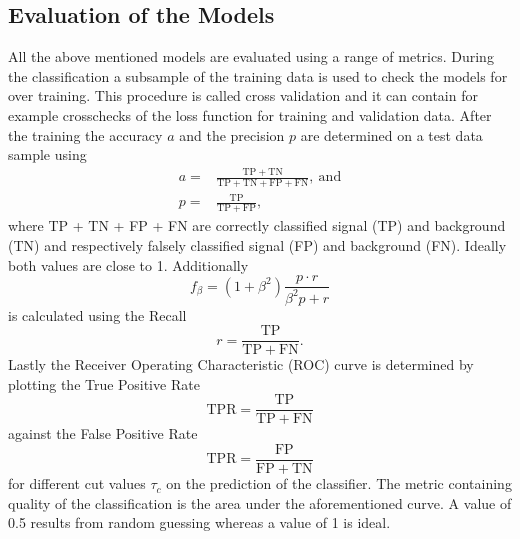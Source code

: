 \subsection{Evaluation of the Models}
All the above mentioned models are evaluated using a range of metrics. During the classification a subsample of the training data is used to check the models for over training. This procedure is called cross validation and it can contain for example crosschecks of the loss function for training and validation data. After the training the accuracy $a$ and the precision $p$ are determined on a test data sample using 
\begin{align*}
	a =& \frac{\mathrm{TP + TN}}{\mathrm{TP + TN + FP + FN}},\ \mathrm{and}\\
	p=&  \frac{\mathrm{TP}}{\mathrm{TP + FP}},
\end{align*}
where TP + TN + FP + FN are correctly classified signal (TP) and background (TN) and respectively falsely classified signal (FP) and background (FN). Ideally both values are close to 1. 
Additionally 
\begin{equation}
	f_\beta = (1+\beta^2) \frac{p\cdot r}{\beta^2p+r}
\end{equation}
is calculated using the Recall
\begin{equation*}
r = \frac{\mathrm{TP}}{\mathrm{TP + FN}}.
\end{equation*}
Lastly the Receiver Operating Characteristic (ROC) curve is determined by plotting the True Positive Rate 
\begin{equation*}
	\mathrm{TPR} = \frac{\mathrm{TP}}{\mathrm{TP + FN}}
\end{equation*}
against the False Positive Rate 
\begin{equation*}
	\mathrm{TPR} = \frac{\mathrm{FP}}{\mathrm{FP + TN}}
\end{equation*}
for different cut values $\tau_c$ on the prediction of the classifier. The metric containing quality of the classification is the area under the aforementioned curve. A value of 0.5 results from random guessing whereas a value of 1 is ideal.









